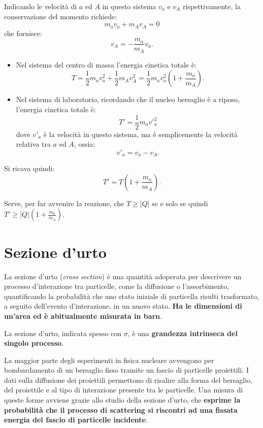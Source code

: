 \documentclass[a4paper,11pt,twoside,openany]{book}
\theoremstyle{definition}
\theoremstyle{plain}
\theoremstyle{plain}
\theoremstyle{definition}
\begin{document}
Indicando le velocità di $a$ ed $A$ in questo sistema $v_a$ e $v_A$ rispettivamente, la conservazione del momento richiede:
\begin{equation}
m_av_a+m_Av_A=0
\end{equation}
che fornisce:
\begin{equation}
v_A=-\frac{m_a}{m_A}v_a.
\end{equation}

\begin{itemize}
\item Nel sistema del centro di massa l'energia cinetica totale è:
\begin{equation}
T=\frac{1}{2}m_av_a^2+\frac{1}{2}m_Av_A^2=\frac{1}{2}m_av_a^2\left(1+\frac{m_a}{m_A}\right).
\end{equation}

\item Nel sistema di laboratorio, ricordando che il nucleo bersaglio è a riposo, l'energia cinetica totale è:
\begin{equation}
T'=\frac{1}{2}m_a{v'}_a^2
\end{equation}
dove ${v'}_a$ è la velocità in questo sistema, ma è semplicemente la velocità relativa tra $a$ ed $A$, ossia: $${v'}_a=v_a-v_A.$$
\end{itemize}

Si ricava quindi:
\begin{equation}
T'=T\left(1+\frac{m_a}{m_A}\right).
\end{equation}

Serve, per far avvenire la reazione, che $T\ge |Q|$ se e solo se quindi $T'\ge |Q|\left(1+\frac{m_a}{m_A}\right)$.

\section{Sezione d'urto} %
La sezione d'urto (\emph{cross section}) è una quantità adoperata per descrivere un processo d'interazione tra particelle, come la diffusione o l'assorbimento, quantificando la probabilità che uno stato iniziale di particella risulti trasformato, a seguito dell'evento d'interazione, in un nuovo stato. \textbf{Ha le dimensioni di un'area ed è abitualmente misurata in barn}.

La sezione d'urto, indicata spesso con $\sigma$, è una \textbf{grandezza intrinseca del singolo processo}.

La maggior parte degli esperimenti in fisica nucleare avvengono per bombardamento di un bersaglio fisso tramite un fascio di particelle proiettili. I dati sulla diffusione dei proiettili permettono di risalire alla forma del bersaglio, del proiettile e al tipo di interazione presente tra le particelle. Una misura di queste forme avviene grazie allo studio della sezione d'urto, che \textbf{esprime la probabilità che il processo di scattering si riscontri ad una fissata energia del fascio di particelle incidente}.
\end{document}
